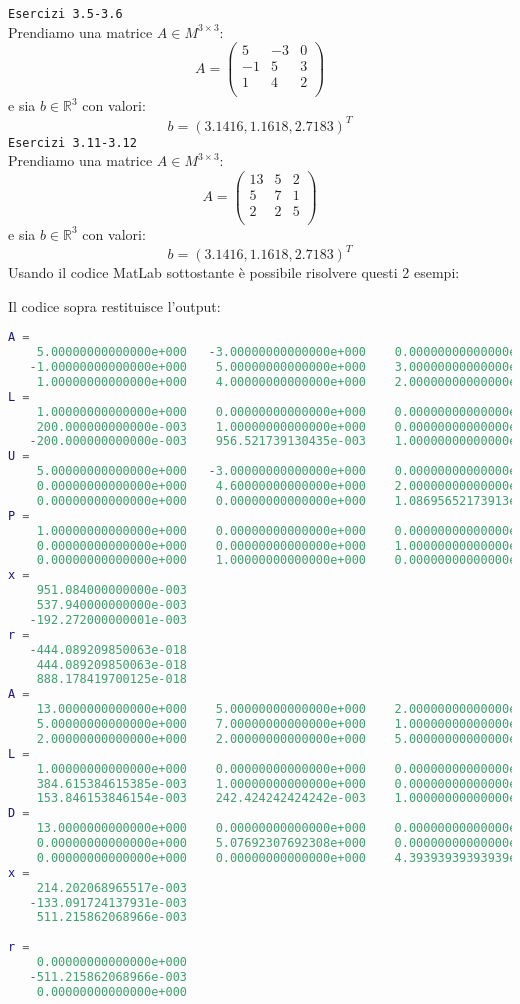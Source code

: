 \begin{flushleft}
\texttt{Esercizi 3.5-3.6} \\
Prendiamo una matrice $A\in M^{3\times 3}$:
\[ 
A =
\begin{pmatrix}
    5  & -3  &  0 \\
   -1  &  5  &  3 \\
    1  &  4  &  2 \\
 \end{pmatrix}
\]
e sia $b\in \mathbb{R}^3$ con valori:
\[
{b} = (3.1416, 1.1618, 2.7183)^T
\]
\texttt{Esercizi 3.11-3.12} \\
Prendiamo una matrice $A\in M^{3\times 3}$:
\[ 
A =
\begin{pmatrix}
  13 & 5 & 2 \\
  5 & 7 & 1 \\
  2 & 2 & 5 \\
 \end{pmatrix}
\]
e sia $b\in \mathbb{R}^3$ con valori:
\[
{b} = (3.1416, 1.1618, 2.7183)^T
\]
\newpage
Usando il codice MatLab sottostante è possibile risolvere questi 2 esempi:

Il codice sopra restituisce l'output:
\begin{lstlisting}[language=matlab, basicstyle = \small]
A =
    5.00000000000000e+000   -3.00000000000000e+000    0.00000000000000e+000
   -1.00000000000000e+000    5.00000000000000e+000    3.00000000000000e+000
    1.00000000000000e+000    4.00000000000000e+000    2.00000000000000e+000
L =
    1.00000000000000e+000    0.00000000000000e+000    0.00000000000000e+000
    200.000000000000e-003    1.00000000000000e+000    0.00000000000000e+000
   -200.000000000000e-003    956.521739130435e-003    1.00000000000000e+000
U =
    5.00000000000000e+000   -3.00000000000000e+000    0.00000000000000e+000
    0.00000000000000e+000    4.60000000000000e+000    2.00000000000000e+000
    0.00000000000000e+000    0.00000000000000e+000    1.08695652173913e+000
P =
    1.00000000000000e+000    0.00000000000000e+000    0.00000000000000e+000
    0.00000000000000e+000    0.00000000000000e+000    1.00000000000000e+000
    0.00000000000000e+000    1.00000000000000e+000    0.00000000000000e+000
x =
    951.084000000000e-003
    537.940000000000e-003
   -192.272000000001e-003
r =
   -444.089209850063e-018
    444.089209850063e-018
    888.178419700125e-018
A =
    13.0000000000000e+000    5.00000000000000e+000    2.00000000000000e+000
    5.00000000000000e+000    7.00000000000000e+000    1.00000000000000e+000
    2.00000000000000e+000    2.00000000000000e+000    5.00000000000000e+000
L =
    1.00000000000000e+000    0.00000000000000e+000    0.00000000000000e+000
    384.615384615385e-003    1.00000000000000e+000    0.00000000000000e+000
    153.846153846154e-003    242.424242424242e-003    1.00000000000000e+000
D =
    13.0000000000000e+000    0.00000000000000e+000    0.00000000000000e+000
    0.00000000000000e+000    5.07692307692308e+000    0.00000000000000e+000
    0.00000000000000e+000    0.00000000000000e+000    4.39393939393939e+000
x =
    214.202068965517e-003
   -133.091724137931e-003
    511.215862068966e-003
    
r =
    0.00000000000000e+000
   -511.215862068966e-003
    0.00000000000000e+000
\end{lstlisting}
\end{flushleft}